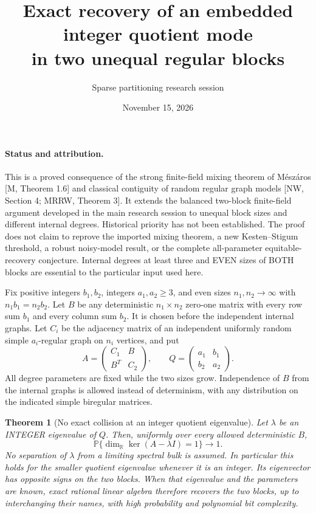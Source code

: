 \documentclass[11pt]{article}
\title{Exact recovery of an embedded integer quotient mode\\in two unequal regular blocks}
\author{Sparse partitioning research session}
\date{November 15, 2026}
\newtheorem{theorem}{Theorem}
\newcommand{\Prb}{\mathbb P}
\begin{document}
\maketitle

\paragraph{Status and attribution.}
This is a proved consequence of the strong finite-field mixing theorem of
M\'esz\'aros [M, Theorem 1.6] and classical contiguity of random regular graph
models [NW, Section 4; MRRW, Theorem 3]. It extends the balanced two-block
finite-field argument developed in the main research session to unequal
block sizes and different internal degrees. Historical priority has not
been established. The proof does not claim to reprove the imported mixing
theorem, a new Kesten--Stigum threshold, a robust noisy-model result, or
the complete all-parameter equitable-recovery conjecture. Internal
degrees at least three and EVEN sizes of BOTH blocks are essential to the
particular input used here.

Fix positive integers $b_1,b_2$, integers $a_1,a_2\geq3$, and even sizes
$n_1,n_2\to\infty$ with $n_1b_1=n_2b_2$. Let $B$ be any deterministic
$n_1\times n_2$ zero-one matrix with every row sum $b_1$ and every column
sum $b_2$. It is chosen before the independent internal graphs. Let
$C_i$ be the adjacency matrix of an independent uniformly random simple
$a_i$-regular graph on $n_i$ vertices, and put
\[
 A=\begin{pmatrix}C_1&B\\B^T&C_2\end{pmatrix},\qquad
 Q=\begin{pmatrix}a_1&b_1\\b_2&a_2\end{pmatrix}.
 \tag{1}
\]
All degree parameters are fixed while the two sizes grow. Independence
of $B$ from the internal graphs is allowed instead of determinism, with
any distribution on the indicated simple biregular matrices.

\begin{theorem}[No exact collision at an integer quotient eigenvalue]
Let $\lambda$ be an INTEGER eigenvalue of $Q$. Then, uniformly over every
allowed deterministic $B$,
\[
 \Prb\{\dim_{\mathbb R}\ker(A-\lambda I)=1\}\longrightarrow1.
 \tag{2}
\]
No separation of $\lambda$ from a limiting spectral bulk is assumed.
In particular this holds for the smaller quotient eigenvalue whenever it
is an integer. Its eigenvector has opposite signs on the two blocks.
When that eigenvalue and the parameters are known, exact rational linear
algebra therefore recovers the two blocks, up to interchanging their
names, with high probability and polynomial bit complexity.
\end{theorem}
\end{document}
